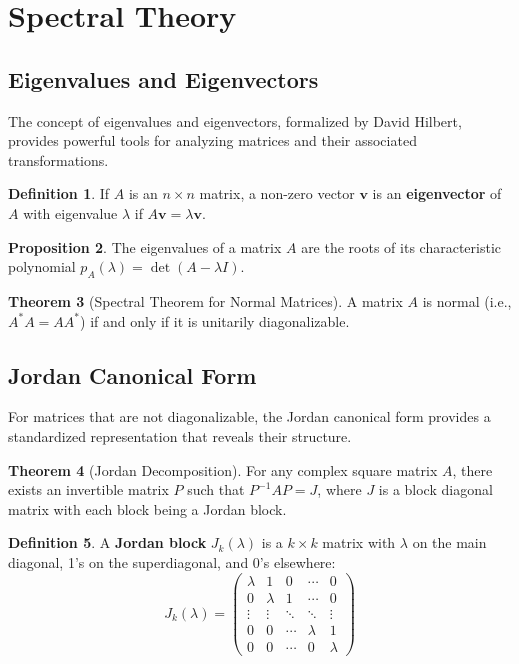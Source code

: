 \documentclass[12pt,a4paper]{article}
\theoremstyle{definition}
\newtheorem{theorem}{Theorem}[section]
\newtheorem{proposition}[theorem]{Proposition}
\newtheorem{definition}[theorem]{Definition}
\begin{document}
\section{Spectral Theory}

\subsection{Eigenvalues and Eigenvectors}
The concept of eigenvalues and eigenvectors, formalized by David Hilbert, provides powerful tools for analyzing matrices and their associated transformations.

\begin{definition}
If $A$ is an $n \times n$ matrix, a non-zero vector $\mathbf{v}$ is an \textbf{eigenvector} of $A$ with eigenvalue $\lambda$ if $A\mathbf{v} = \lambda\mathbf{v}$.
\end{definition}

\begin{proposition}
The eigenvalues of a matrix $A$ are the roots of its characteristic polynomial $p_A(\lambda) = \det(A - \lambda I)$.
\end{proposition}

\begin{theorem}[Spectral Theorem for Normal Matrices]
A matrix $A$ is normal (i.e., $A^*A = AA^*$) if and only if it is unitarily diagonalizable.
\end{theorem}

\subsection{Jordan Canonical Form}
For matrices that are not diagonalizable, the Jordan canonical form provides a standardized representation that reveals their structure.

\begin{theorem}[Jordan Decomposition]
For any complex square matrix $A$, there exists an invertible matrix $P$ such that $P^{-1}AP = J$, where $J$ is a block diagonal matrix with each block being a Jordan block.
\end{theorem}

\begin{definition}
A \textbf{Jordan block} $J_k(\lambda)$ is a $k \times k$ matrix with $\lambda$ on the main diagonal, 1's on the superdiagonal, and 0's elsewhere:
\[J_k(\lambda) = 
\begin{pmatrix}
\lambda & 1 & 0 & \cdots & 0 \\
0 & \lambda & 1 & \cdots & 0 \\
\vdots & \vdots & \ddots & \ddots & \vdots \\
0 & 0 & \cdots & \lambda & 1 \\
0 & 0 & \cdots & 0 & \lambda
\end{pmatrix}
\]
\end{definition}
\end{document}
